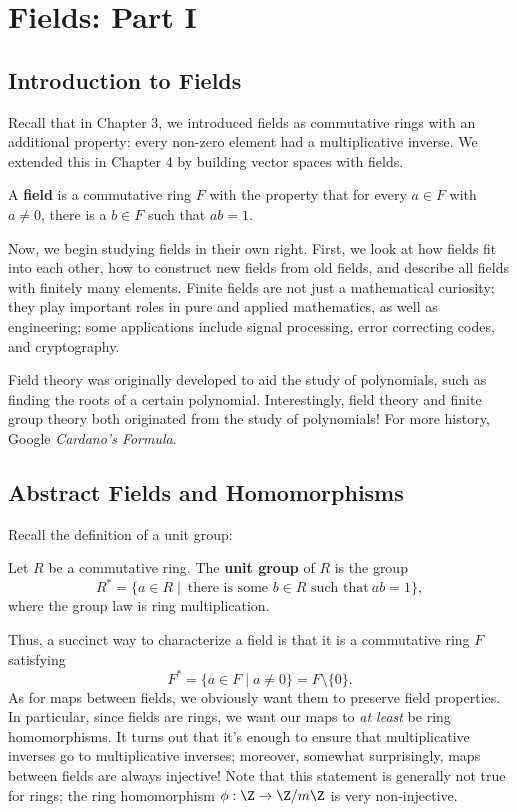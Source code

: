\documentclass[math1530-lecture-notes]{subfiles}
\begin{document}
\chapter{Fields: Part I}

\section{Introduction to Fields}

Recall that in Chapter 3, we introduced fields as commutative rings with an additional property:
every non-zero element had a multiplicative inverse. We extended this in Chapter 4 by building
vector spaces with fields.

\begin{definition}[Fields]{}
  A \textbf{field} is a commutative ring $F$ with the property that for every $a\in F$ with $a\neq
  0$, there is a $b\in F$ such that $ab=1$.
\end{definition}

Now, we begin studying fields in their own right. First, we look at how fields fit into each other,
how to construct new fields from old fields, and describe all fields with finitely many elements.
Finite fields are not just a mathematical curiosity; they play important roles in pure and applied
mathematics, as well as engineering; some applications include signal processing, error correcting
codes, and cryptography.

\begin{remark}
  Field theory was originally developed to aid the study of polynomials, such as finding the roots
  of a certain polynomial. Interestingly, field theory and finite group theory both originated from
  the study of polynomials! For more history, Google \textit{Cardano's Formula}.
\end{remark}

\section{Abstract Fields and Homomorphisms}

Recall the definition of a unit group:
\begin{definition}{}
  Let $R$ be a commutative ring. The \textbf{unit group} of $R$ is the group \[
    R^* = \{a\in R\mid ~\text{there is some $b\in R$ such that}~ab=1\} 
  ,\] where the group law is ring multiplication.
\end{definition}

Thus, a succinct way to characterize a field is that it is a commutative ring $F$ satisfying \[
  F^* = \{a\in F\mid a\neq 0\} = F \setminus \{ 0 \}
.\] As for maps between fields, we obviously want them to preserve field properties. In particular,
since fields are rings, we want our maps to \textit{at least} be ring homomorphisms. It turns out
that it's enough to ensure that multiplicative inverses go to multiplicative inverses; moreover,
somewhat surprisingly, maps between fields are always injective! Note that this statement is
generally not true for rings; the ring homomorphism $\phi:\Z\to \Z / m\Z$ is very non-injective.
\end{document}
